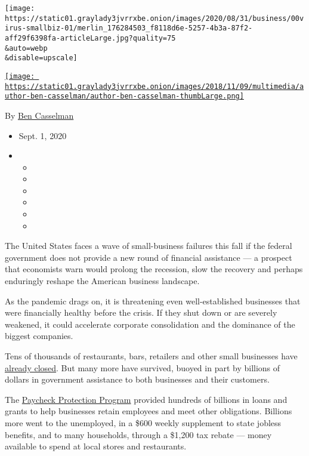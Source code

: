 \texttt{[image: https://static01.graylady3jvrrxbe.onion/images/2020/08/31/business/00virus-smallbiz-01/merlin\_176284503\_f8118d6e-5257-4b3a-87f2-aff29f6398fa-articleLarge.jpg?quality=75\\\&auto=webp\\\&disable=upscale]}

\href{https://www.nytimes3xbfgragh.onion/by/ben-casselman}{\texttt{[image: https://static01.graylady3jvrrxbe.onion/images/2018/11/09/multimedia/author-ben-casselman/author-ben-casselman-thumbLarge.png]}}

By \href{https://www.nytimes3xbfgragh.onion/by/ben-casselman}{Ben
Casselman}

\begin{itemize}
\item
  Sept. 1, 2020
\item
  \begin{itemize}
  \item
  \item
  \item
  \item
  \item
  \item
  \end{itemize}
\end{itemize}

The United States faces a wave of small-business failures this fall if
the federal government does not provide a new round of financial
assistance --- a prospect that economists warn would prolong the
recession, slow the recovery and perhaps enduringly reshape the American
business landscape.

As the pandemic drags on, it is threatening even well-established
businesses that were financially healthy before the crisis. If they shut
down or are severely weakened, it could accelerate corporate
consolidation and the dominance of the biggest companies.

Tens of thousands of restaurants, bars, retailers and other small
businesses have
\href{https://www.nytimes3xbfgragh.onion/2020/07/13/business/small-businesses-coronavirus.html}{already
closed}. But many more have survived, buoyed in part by billions of
dollars in government assistance to both businesses and their customers.

The
\href{https://www.nytimes3xbfgragh.onion/2020/08/28/business/ppp-small-business-fraud-coronavirus.html}{Paycheck
Protection Program} provided hundreds of billions in loans and grants to
help businesses retain employees and meet other obligations. Billions
more went to the unemployed, in a \$600 weekly supplement to state
jobless benefits, and to many households, through a \$1,200 tax rebate
--- money available to spend at local stores and restaurants.

